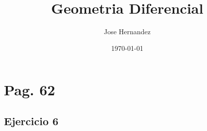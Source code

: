 \documentclass{article}
\title{Geometria Diferencial}
\author{Jose Hernandez}
\date{\today}
\begin{document}
\maketitle

\section*{Pag. 62}
\subsection*{Ejercicio 6}
\end{document}
